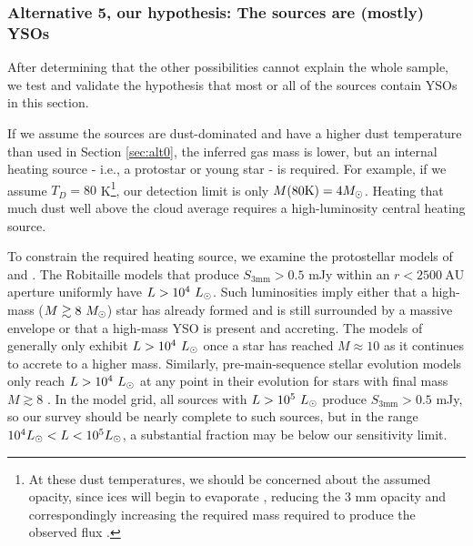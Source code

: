 \documentclass[twocolumn]{aastex61}
\begin{document}
\subsubsection{Alternative 5, our hypothesis: The sources are (mostly) YSOs}
\label{sec:theyareprotostars}
After determining that the other possibilities cannot explain
the whole sample, we test and validate the hypothesis
that most or all of the sources contain YSOs in this section.

If we assume the sources are dust-dominated and have a higher dust temperature
than used in Section \ref{sec:alt0}, the inferred gas mass is lower, but an
internal heating source - i.e., a protostar or young star - is required.  For
example, if we assume $T_D=80$ K\footnote{At these dust temperatures, we should
be concerned about the assumed opacity, since ices will begin to evaporate
\citep[e.g.,][]{Bergin1995a}, reducing the 3 mm opacity and correspondingly
increasing the required mass required to produce the observed flux
\citep{Ossenkopf1994a}.  }, our detection limit is only $M(80\mathrm{K}) = 4
M_{\odot}$.  Heating that much dust well above the cloud average requires a
high-luminosity central heating source.

To constrain the required heating source, we examine the protostellar models of
\citet[][specifically, the \texttt{spubhmi} and \texttt{spubsmi}
models]{Robitaille2017a} and \citet{Zhang2015f}.  The Robitaille models that
produce $S_{3 \mathrm{mm}} > 0.5$ mJy within an $r<2500\mathrm{~AU}$ aperture
uniformly have
${L>10^4~L_{\odot}}$.  Such luminosities imply either that a high-mass
(${M\gtrsim8~M_{\odot}}$) star has already formed and is still surrounded by a
massive envelope or that a high-mass YSO is present and accreting.
The models of \citet{Zhang2015f} generally only exhibit $L>10^4~L_{\odot}$ once a
star has reached $M\approx10$ \msun as it continues to accrete to a higher
mass.  Similarly, pre-main-sequence stellar evolution models
\citep[e.g.,][]{Haemmerle2013a} only reach $L>10^4~L_{\odot}$ at any point in their
evolution for stars with final mass $M\gtrsim8$ \msun.  In the
\citet{Robitaille2017a} model grid, all sources with $L>10^5~L_{\odot}$ produce
$S_{3 \textrm{mm}}>0.5$ mJy, so our survey should be nearly complete to such
sources, but in the range $10^4 L_{\odot} < L < 10^5 L_{\odot}$, a substantial fraction
may be below our sensitivity limit.
\end{document}
